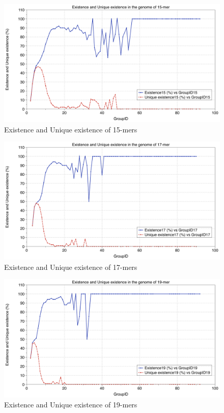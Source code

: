 \documentclass[11pt]{article}
\begin{document}
\begin{figure}
    \centering
    \includegraphics[scale=0.275]{image/15Plot.png}
    \caption{Existence and Unique existence of 15-mers}
    \label{fig:15}
\end{figure}
\begin{figure}
    \centering
    \includegraphics[scale=0.275]{image/17Plot.png}
    \caption{Existence and Unique existence of 17-mers}
    \label{fig:17}
\end{figure}\begin{figure}
    \centering
    \includegraphics[scale=0.275]{image/19Plot.png}
    \caption{Existence and Unique existence of 19-mers}
    \label{fig:19}
\end{figure}
\end{document}
